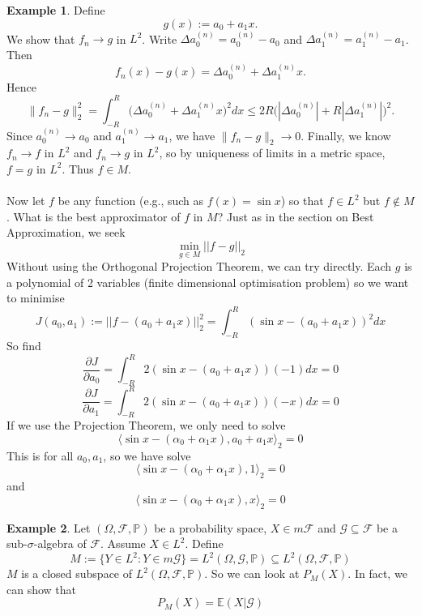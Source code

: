 \documentclass[11pt,a4paper]{article}
\theoremstyle{definition}
\newtheorem{example}{Example}[section]
\begin{document}
\begin{example}
\noindent
Define
\[
    g(x) := a_0 + a_1 x.
\]
We show that $f_n \to g$ in $L^2$.  Write
$\Delta a_0^{(n)} = a_0^{(n)} - a_0$ and 
$\Delta a_1^{(n)} = a_1^{(n)} - a_1$.
Then
\[
    f_n(x) - g(x) 
    = \Delta a_0^{(n)} + \Delta a_1^{(n)} x.
\]
Hence
\[
\|f_n - g\|_2^2
    = \int_{-R}^R \big(\Delta a_0^{(n)} + \Delta a_1^{(n)} x\big)^2 dx
    \le 2R\big( |\Delta a_0^{(n)}|
        + R |\Delta a_1^{(n)}| \big)^2.
\]
Since $a_0^{(n)} \to a_0$ and $a_1^{(n)} \to a_1$, we have
$\|f_n - g\|_2 \to 0$. Finally, we know $f_n \to f$ in $L^2$ and $f_n \to g$ in $L^2$, so by 
uniqueness of limits in a metric space, $f = g$ in $L^2$.  
Thus $f \in M$.
~\\ ~\\ Now let $f$ be any function (e.g., such as $f(x) = \sin x$) so that $f \in L^2$ but $f \notin M$. What is the best approximator of $f$ in $M$? Just as in the section on Best Approximation, we seek 
    \[
    \min \limits _{g \in M} ||f-g||_2 
    \]
    Without using the Orthogonal Projection Theorem, we can try directly. Each $g$ is a polynomial of 2 variables (finite dimensional optimisation problem) so we want to minimise 
    \[
    J(a_0, a_1) := ||f - (a_0 + a_1x)||^2_2 = \int _{-R}^R (\sin x - (a_0 + a_1x))^2 dx
    \]
    So find 
    \[
    \frac{\partial J}{\partial a_0} = \int _{-R}^R 2(\sin x - (a_0 + a_1x))(-1)dx=0
    \]
    \[
    \frac{\partial J}{\partial a_1} = \int _{-R}^R 2(\sin x - (a_0 + a_1x))(-x)dx=0
    \]
    If we use the Projection Theorem, we only need to solve 
    \[
    \langle \sin x - (\alpha _0 + \alpha _1x), a_0 + a_1x \rangle_2 = 0
    \]
    This is for all $a_0, a_1$, so we have solve 
    \[
    \langle \sin x - (\alpha _0 + \alpha _1 x), 1 \rangle _2 = 0
    \] 
    and 
    \[
    \langle \sin x - (\alpha _0 + \alpha _1x), x \rangle _2 = 0
    \]
\end{example}

\begin{example}
    Let $(\Omega, \mathcal{F}, \mathbb{P})$ be a probability space, $X \in m \mathcal{F}$ and $\mathcal{G} \subseteq \mathcal{F}$ be a sub-$\sigma$-algebra of $\mathcal{F}$. Assume $X \in L^2$. Define \[M := \{Y \in L^2: Y \in m \mathcal{G}\} = L^2(\Omega, \mathcal{G}, \mathbb{P}) \subseteq L^2(\Omega, \mathcal{F}, \mathbb{P})\]$M$ is a closed subspace of $L^2(\Omega, \mathcal{F}, \mathbb{P})$. So we can look at $P_M(X)$. In fact, we can show that \[P_M(X) = \mathbb{E}(X | \mathcal{G})\]
\end{example}
\end{document}
